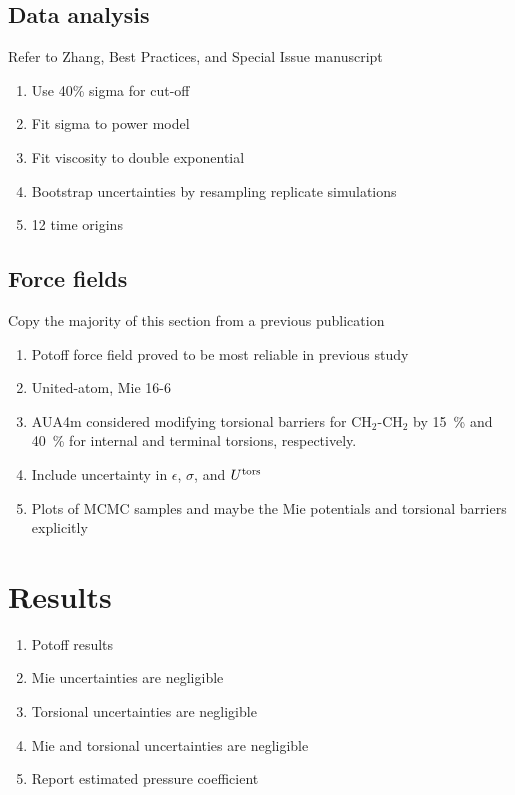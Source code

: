 \documentclass[11pt,a4paper]{article}
\begin{document}
\subsection{Data analysis}

Refer to Zhang, Best Practices, and Special Issue manuscript

\begin{enumerate}
	\item Use 40\% sigma for cut-off
	\item Fit sigma to power model
	\item Fit viscosity to double exponential
	\item Bootstrap uncertainties by resampling replicate simulations
	\item 12 time origins
\end{enumerate}

\subsection{Force fields}

Copy the majority of this section from a previous publication

\begin{enumerate}
	\item Potoff force field proved to be most reliable in previous study
	\item United-atom, Mie 16-6
	\item AUA4m considered modifying torsional barriers for CH$_2$-CH$_2$ by 15~\% and 40~\% for internal and terminal torsions, respectively.
	\item Include uncertainty in $\epsilon$, $\sigma$, and $U^{\rm tors}$
	\item Plots of MCMC samples and maybe the Mie potentials and torsional barriers explicitly
\end{enumerate}

\section{Results}

\begin{enumerate}
	\item Potoff results
	\item Mie uncertainties are negligible
	\item Torsional uncertainties are negligible
	\item Mie and torsional uncertainties are negligible
	\item Report estimated pressure coefficient
\end{enumerate}
\end{document}
